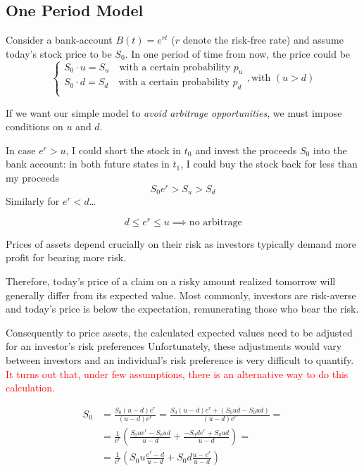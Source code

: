 \documentclass[12pt,a4paper]{book}
\begin{document}
\subsection{One Period Model}
Consider a bank-account $B(t)=e^{rt}$ ($r$ denote the risk-free rate) and assume today's stock price to be $S_0$. In one period of time from now, the price could be 
\begin{equation*}
\begin{cases}
S_0\cdot u = S_u \quad\text{with a certain probability $p_u$} \\
S_0\cdot d = S_d \quad\text{with a certain probability $p_d$}\\ 
\end{cases}, \text{with }(u > d)
\end{equation*}

If we want our simple model to \emph{avoid arbitrage opportunities}, we must impose conditions on $u$ and $d$. 
		
In case $e^r > u$, I could short the stock in $t_0$ and invest the proceeds $S_0$ into the bank account: in both future states in $t_1$, I could buy the stock back for less than my proceeds 
\begin{equation*}
S_0e^r > S_u > S_d
\end{equation*} Similarly for $e^r < d$\ldots

\begin{equation*}
\boxed{d\le e^r \le u \implies \text{no arbitrage}}
\end{equation*}

Prices of assets depend crucially on their risk as investors typically demand more profit for bearing more risk.

Therefore, today's price of a claim on a risky amount realized tomorrow will generally differ from its expected value.
Most commonly, investors are risk-averse and today's price is below the expectation, remunerating those who bear the risk.

Consequently to price assets, the calculated expected values need to be adjusted for an investor's risk preferences
Unfortunately, these adjustments would vary between investors and an individual's risk preference is very difficult to quantify.
\textcolor{red}{It turns out that, under few assumptions, there is an alternative way to do this calculation.}

\begin{equation*}
\begin{aligned}
S_0 &= \frac{S_0(u-d)e^r}{(u-d)e^r} = \frac{S_0(u-d)e^r + (S_0ud - S_0ud)}{(u-d)e^r}=\\
&= \frac{1}{e^r}\left(\frac{S_0ue^r - S_0ud}{u-d} + \frac{-S_0de^r + S_0ud}{u-d}\right)=\\
&= \frac{1}{e^r}\left(S_0u\frac{e^r - d}{u-d} + S_0d\frac{u - e^r}{u-d}\right)
\end{aligned}
\end{equation*}
\end{document}
